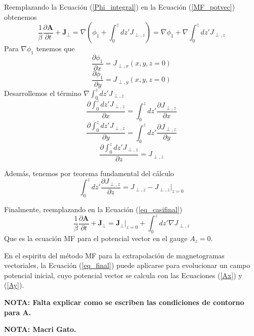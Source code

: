 \documentclass[a4paper,10pt]{article}
\def\bA{{\boldsymbol{A}}}
\def\bJ{{\boldsymbol{J}}}
\def\dt#1{\frac{\partial #1}{\partial t}}
\def\dx#1{\frac{\partial #1}{\partial x}}
\def\dy#1{\frac{\partial #1}{\partial y}}
\def\dz#1{\frac{\partial #1}{\partial z}}
\def\nota#1{{\bf NOTA: #1}}
\def\eq#1{Ecuación (\ref{#1})}
\def\eqs#1#2{Ecuaciones (\ref{#1}) y (\ref{#2})}
\def\jperp{\bJ_\perp}
\begin{document}
Reemplazando la \eq{Phi_integral} en la \eq{MF_potvec} obtenemos
\begin{equation}
  \frac{1}{\beta} \dt{\bA} + \jperp = \nabla \left(\phi_1 + \int_0^z dz' J_{\perp,z}\right) =
  \nabla \phi_1 + \nabla \int_0^z dz' J_{\perp,z}
  \label{eq_casifinal}
\end{equation} 
Para $\nabla \phi_1$ tenemos que 
\begin{equation}
 \dx{\phi_1}=J_{\perp,x}(x,y,z=0)
\end{equation}
\begin{equation}
 \dy{\phi_1}=J_{\perp,y}(x,y,z=0)
\end{equation}
Desarrollemos el término $\nabla \int_0^z dz' J_{\perp,z}$
\begin{equation}
 \dx{\int_0^z dz' J_{\perp,z}} =  \int_0^z dz' \dx{ J_{\perp,z}} 
\end{equation}
\begin{equation}
 \dy{\int_0^z dz' J_{\perp,z}} =  \int_0^z dz' \dy{ J_{\perp,z}} 
\end{equation}
\begin{equation}
 \dz{\int_0^z dz' J_{\perp,z}} =  { J_{\perp,z}} 
\end{equation}

Además, tenemos por teorema fundamental del cálculo
\begin{equation}
 \int_0^z dz' \dz{ J_{\perp,z}} = { J_{\perp,z}} - { J_{\perp,z}}\rvert_{z=0}
\end{equation}

Finalmente, reemplazando en la \eq{eq_casifinal}
\begin{equation}
 \frac{1}{\beta} \dt{\bA} + \jperp = \jperp\rvert_{z=0} +\int_0^z dz' \nabla J_{\perp,z}
 \label{eq_final}
\end{equation}
Que es la ecuación MF para el potencial vector en el gauge $A_z=0$.

En el espiritu del método MF para la extrapolación de magnetogramas vectoriales, la \eq{eq_final} puede aplicarse para evolucionar un campo potencial inicial, cuyo potencial vector se calcula con las \eqs{Ax}{Ay}.

\nota{Falta explicar como se escriben las condiciones de contorno para $\bA$.}

\nota{Macri Gato.}
\end{document}
